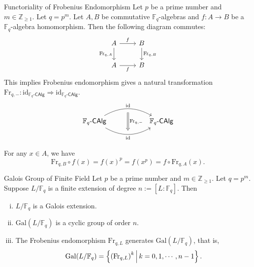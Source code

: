 \begin{proposition}{Functoriality of Frobenius Endomorphism}{}
    Let $p$ be a prime number and $m\in\mathbb{Z}_{\ge1}$. Let $q=p^m$. Let $A,B$ be commutative $\mathbb{F}_q$-algebras and $f:A\to B$ be a $\mathbb{F}_q$-algebra homomorphism. Then the following diagram commutes:
    \[
        \begin{tikzcd}
            A \arrow[d, "{\mathrm{Fr}_{q,A}}"'] \arrow[r, "f"] & B \arrow[d, "{\mathrm{Fr}_{q,B}}"] \\
            A \arrow[r, "f"']                                  & B                                 
            \end{tikzcd}
    \]
    This implies Frobenius endomorphism gives a natural transformation $\mathrm{Fr}_{q,-}:\mathrm{id}_{\mathbb{F}_q\text{-}\mathsf{CAlg}}\Rightarrow \mathrm{id}_{\mathbb{F}_q\text{-}\mathsf{CAlg}}$.
    \[
        \begin{tikzcd}[ampersand replacement=\&]
            \mathbb{F}_q\text{-}\mathsf{CAlg}\arrow[r, "\mathrm{id}"{name=A, above}, bend left] \arrow[r, "\mathrm{id}"'{name=B, below}, bend right] \&[+30pt] \mathbb{F}_q\text{-}\mathsf{CAlg}
            \arrow[Rightarrow, shorten <=5.5pt, shorten >=5.5pt, from=A.south-|B, to=B, "\mathrm{Fr}_{q,-}"]
        \end{tikzcd}
    \]
    
\end{proposition}
\begin{prf}
    For any $x\in A$, we have
    \[
    \mathrm{Fr}_{q,B}\circ f(x)=f(x)^p=f(x^p)=f\circ \mathrm{Fr}_{q,A}(x).
    \]
    \end{prf}


\begin{proposition}{Galois Group of Finite Field}{}
    Let $p$ be a prime number and $m\in\mathbb{Z}_{\ge1}$. Let $q=p^m$. Suppose $L/\mathbb{F}_q$ is a finite extension of degree $n:=[L:\mathbb{F}_q]$. Then
    \begin{enumerate}[(i)]
        \item $L/\mathbb{F}_q$ is a Galois extension.
        \item $\mathrm{Gal}(L/\mathbb{F}_q)$ is a cyclic group of order $n$.
        \item The Frobenius endomorphism $\mathrm{Fr}_{q,L}$ generates $\mathrm{Gal}(L/\mathbb{F}_q)$, that is,
        \[
            \mathrm{Gal}(L/\mathbb{F}_q)=\left\{  \left(\mathrm{Fr}_{q,L}\right)^k\,\middle\vert\, k=0,1,\cdots,n-1\right\}.
        \]
    \end{enumerate}
\end{proposition}


